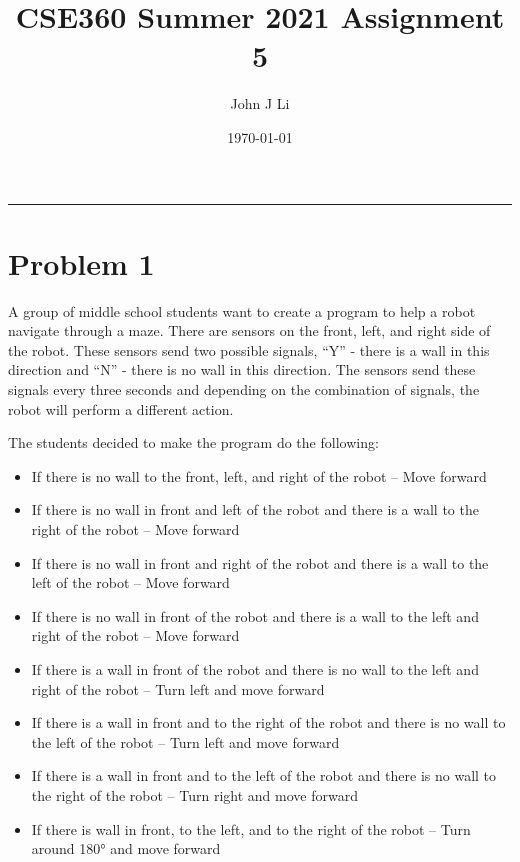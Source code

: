\documentclass{article}
\title{CSE360 Summer 2021 Assignment 5}
\date{\today}
\author{John J Li}
\begin{document}
    \maketitle
    \thispagestyle{empty}
    \noindent\rule{\textwidth}{0.8pt}

    \section*{Problem 1}

    A group of middle school students want to create a program to help a robot navigate
    through a maze. There are sensors on the front, left, and right side of the robot. These
    sensors send two possible signals, “Y” - there is a wall in this direction and “N” - there is
    no wall in this direction. The sensors send these signals every three seconds and
    depending on the combination of signals, the robot will perform a different action.
    
    The students decided to make the program do the following:
    \begin{itemize}
        \item 
        If there is no wall to the front, left, and right of the robot
        -- Move forward
        \item
        If there is no wall in front and left of the robot and there is a wall to the right of the
        robot
        -- Move forward
        \item
        If there is no wall in front and right of the robot and there is a wall to the left of the
        robot
        -- Move forward
        \item
        If there is no wall in front of the robot and there is a wall to the left and right of the
        robot
        -- Move forward
        \item
        If there is a wall in front of the robot and there is no wall to the left and right of the
        robot
        -- Turn left and move forward
        \item
        If there is a wall in front and to the right of the robot and there is no wall to the left
        of the robot
        -- Turn left and move forward
        \item
        If there is a wall in front and to the left of the robot and there is no wall to the right
        of the robot
        -- Turn right and move forward
        \item
        If there is wall in front, to the left, and to the right of the robot
        -- Turn around 180° and move forward
    \end{itemize}
\end{document}
